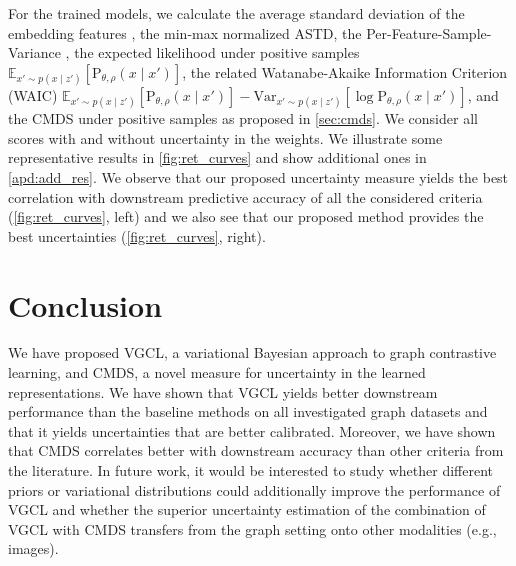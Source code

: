 \documentclass[tablecaption=bottom,wcp]{jmlr} %
\begin{document}
For the trained models, we calculate the average standard deviation of the embedding features \citep[ASTD,][]{BGCL}, the min-max normalized ASTD, the Per-Feature-Sample-Variance  \citep{ardeshir2022uncertainty}, the expected likelihood under positive samples $\mathbb{E}_{x' \sim p(x\mid z')} \left[ \mathrm{P}_{\theta, \rho}(x\mid x') \right]$, the related Watanabe-Akaike Information Criterion (WAIC) $\mathbb{E}_{x' \sim p(x\mid z')} \left[ \mathrm{P}_{\theta, \rho}(x\mid x') \right] - \mathrm{Var}_{x' \sim p(x\mid z')} \left[ \log \mathrm{P}_{\theta,\rho}\left(x\mid x' \right) \right]$, and the CMDS under positive samples as proposed in \cref{sec:cmds}. We consider all scores with and without uncertainty in the weights. We illustrate some representative results in \cref{fig:ret_curves} and show additional ones in \cref{apd:add_res}. We observe that our proposed uncertainty measure yields the best correlation with downstream predictive accuracy of all the considered criteria (\cref{fig:ret_curves}, left) and we also see that our proposed method provides the best uncertainties (\cref{fig:ret_curves}, right).







\section{Conclusion}

We have proposed VGCL, a variational Bayesian approach to graph contrastive learning, and CMDS, a novel measure for uncertainty in the learned representations.
We have shown that VGCL yields better downstream performance than the baseline methods on all investigated graph datasets and that it yields uncertainties that are better calibrated.
Moreover, we have shown that CMDS correlates better with downstream accuracy than other criteria from the literature.
In future work, it would be interested to study whether different priors or variational distributions could additionally improve the performance of VGCL and whether the superior uncertainty estimation of the combination of VGCL with CMDS transfers from the graph setting onto other modalities (e.g., images).


\end{document}

